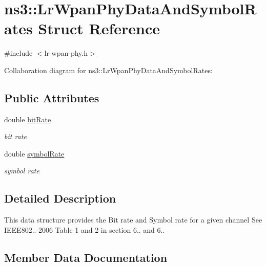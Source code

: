 \hypertarget{structns3_1_1LrWpanPhyDataAndSymbolRates}{}\section{ns3\+:\+:Lr\+Wpan\+Phy\+Data\+And\+Symbol\+Rates Struct Reference}
\label{structns3_1_1LrWpanPhyDataAndSymbolRates}


{\ttfamily \#include $<$lr-\/wpan-\/phy.\+h$>$}



Collaboration diagram for ns3\+:\+:Lr\+Wpan\+Phy\+Data\+And\+Symbol\+Rates\+:
\subsection*{Public Attributes}
\begin{DoxyCompactItemize}
\item 
double \hyperlink{structns3_1_1LrWpanPhyDataAndSymbolRates_a47170a3cf10224bb78088f117652d234}{bit\+Rate}
\begin{DoxyCompactList}\small\item\em bit rate \end{DoxyCompactList}\item 
double \hyperlink{structns3_1_1LrWpanPhyDataAndSymbolRates_a2670dd2cbf31f676ecd8676c74d85cc4}{symbol\+Rate}
\begin{DoxyCompactList}\small\item\em symbol rate \end{DoxyCompactList}\end{DoxyCompactItemize}


\subsection{Detailed Description}
This data structure provides the Bit rate and Symbol rate for a given channel See I\+E\+E\+E802..-\/2006 Table 1 and 2 in section 6.. and 6.. 

\subsection{Member Data Documentation}
